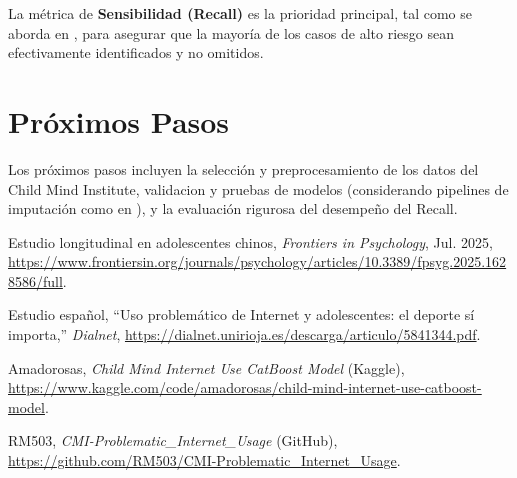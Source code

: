 \documentclass[conference]{IEEEtran}
\begin{document}
	La métrica de \textbf{Sensibilidad (Recall)} es la prioridad principal, tal como se aborda en \cite{referencia4}, para asegurar que la mayoría de los casos de alto riesgo sean efectivamente identificados y no omitidos.
	
	\section{Próximos Pasos}
	\label{sec:pasos}
	
	Los próximos pasos incluyen la selección y preprocesamiento de los datos del Child Mind Institute, validacion y pruebas de modelos (considerando pipelines de imputación como en \cite{referencia5}), y la evaluación rigurosa del desempeño del Recall.
	
	
	\begin{thebibliography}{5}
		
		Estudio longitudinal en adolescentes chinos, \emph{Frontiers in Psychology}, Jul. 2025, \url{https://www.frontiersin.org/journals/psychology/articles/10.3389/fpsyg.2025.1628586/full}.
		
		Estudio español, ``Uso problemático de Internet y adolescentes: el deporte sí importa,'' \emph{Dialnet}, \url{https://dialnet.unirioja.es/descarga/articulo/5841344.pdf}.
		
		Amadorosas, \emph{Child Mind Internet Use CatBoost Model} (Kaggle), \url{https://www.kaggle.com/code/amadorosas/child-mind-internet-use-catboost-model}.
		
		RM503, \emph{CMI-Problematic\_Internet\_Usage} (GitHub), \url{https://github.com/RM503/CMI-Problematic_Internet_Usage}.
		
	\end{thebibliography}
	
\end{document}
